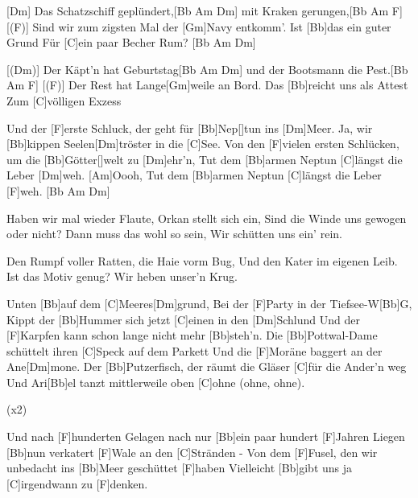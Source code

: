 

\begin{guitar}
	[Dm] Das Schatzschiff geplündert,[Bb Am Dm] mit Kraken gerungen,[Bb Am F]{}
	[(F)] Sind wir zum zigsten Mal der [Gm]Navy entkomm'. Ist [Bb]das ein guter Grund 
	Für [C]ein paar Becher Rum? [Bb Am Dm]{}
	
	[(Dm)] Der Käpt'n hat Geburtstag[Bb Am Dm] und der Bootsmann die Pest.[Bb Am F]{}
	[(F)] Der Rest hat Lange[Gm]weile an Bord. Das [Bb]reicht uns als Attest
	Zum [C]völligen Exzess
	
	Und der [F]erste Schluck, der geht für [Bb]Nep[]tun ins [Dm]Meer.
	Ja, wir [Bb]kippen Seelen[Dm]tröster in die [C]See.
	Von den [F]vielen ersten Schlücken, um die [Bb]Götter[]welt zu [Dm]ehr'n,
	Tut dem [Bb]armen Neptun [C]längst die Leber [Dm]weh. [Am]Oooh,
	Tut dem [Bb]armen Neptun [C]längst die Leber [F]weh. [Bb Am Dm]{}
	
	Haben wir mal wieder Flaute, Orkan stellt sich ein,
	Sind die Winde uns gewogen oder nicht? Dann muss das wohl so sein,
	Wir schütten uns ein' rein.
	
	Den Rumpf voller Ratten, die Haie vorm Bug,
	Und den Kater im eigenen Leib. Ist das Motiv genug?
	Wir heben unser'n Krug.
	
	 
	\pagebreak
	Unten [Bb]auf dem [C]Meeres[Dm]grund,
	Bei der [F]Party in der Tiefsee-W[Bb]G,
	Kippt der [Bb]Hummer sich jetzt [C]einen in den [Dm]Schlund
	Und der [F]Karpfen kann schon lange nicht mehr [Bb]steh'n.
	Die [Bb]Pottwal-Dame schüttelt ihren [C]Speck auf dem Parkett
	Und die [F]Moräne baggert an der Ane[Dm]mone.
	Der [Bb]Putzerfisch, der räumt die Gläser [C]für die Ander'n weg
	Und Ari[Bb]el tanzt mittlerweile oben [C]ohne (ohne, ohne).
	
	  (x2)
	
	Und nach [F]hunderten Gelagen nach nur [Bb]ein paar hundert [F]Jahren
	Liegen [Bb]nun verkatert [F]Wale an den [C]Stränden - 
	Von dem [F]Fusel, den wir unbedacht ins [Bb]Meer geschüttet [F]haben
	Vielleicht [Bb]gibt uns ja [C]irgendwann zu [F]denken.
\end{guitar}